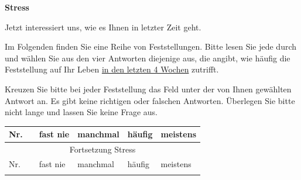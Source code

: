 \begin{flushleft}
\begin{longtable}[c]{ |p{1em}|p{14em}|p{3em}|p{3em}|p{3em}|p{3em}|p{3em}|}
\end{longtable}

\textbf{Stress}

Jetzt interessiert uns, wie es Ihnen in letzter Zeit geht.

\vspace{2mm}
Im Folgenden finden Sie eine Reihe von Feststellungen. Bitte lesen Sie jede durch und wählen Sie aus den vier Antworten diejenige aus, die angibt, wie häufig die Feststellung auf Ihr Leben \underline{in den letzten 4 Wochen} zutrifft.

\vspace{2mm}
Kreuzen Sie bitte bei jeder Feststellung das Feld unter der von Ihnen gewählten Antwort an. Es gibt keine richtigen oder falschen Antworten. Überlegen Sie bitte nicht lange und lassen Sie keine Frage aus.

\begin{longtable}[c]{ |p{1em}|p{14em}|p{4em}|p{4em}|p{4em}|p{4em}|} 
  \hline
  Nr. & & fast nie & manchmal & häufig & meistens \\
  \hline
  \endfirsthead
 
  \hline
  \multicolumn{6}{|c|}{ Fortsetzung Stress}\\
  \hline
  Nr. & & fast nie & manchmal & häufig & meistens \\
  \hline
  \endhead
 
  \hline
  \endfoot
 
  \hline\hline
  \endlastfoot
  

\end{longtable}
\end{flushleft}
